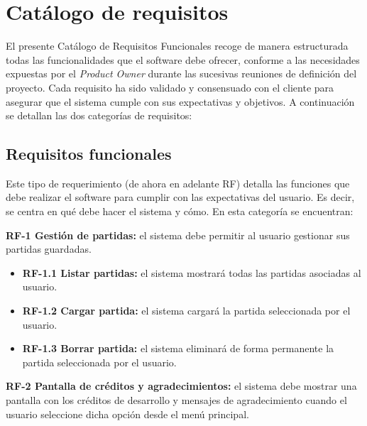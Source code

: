 \section{Catálogo de requisitos}
El presente Catálogo de Requisitos Funcionales recoge de manera estructurada todas las funcionalidades que el software debe ofrecer, conforme a las necesidades expuestas por el \textit{Product Owner} durante las sucesivas reuniones de definición del proyecto. Cada requisito ha sido validado y consensuado con el cliente para asegurar que el sistema cumple con sus expectativas y objetivos. A continuación se detallan las dos categorías de requisitos:

\subsection{Requisitos funcionales}
Este tipo de requerimiento (de ahora en adelante RF) detalla las funciones
que debe realizar el software para cumplir
con las expectativas del usuario. Es decir, se centra en qué debe hacer el
sistema y cómo. En esta categoría se encuentran:

\bigskip

\noindent
\textbf{RF-1 Gestión de partidas:} el sistema debe permitir al usuario gestionar sus partidas guardadas.  
\begin{itemize}
  \item \textbf{RF-1.1 Listar partidas:} el sistema mostrará todas las partidas asociadas al usuario.
  \item \textbf{RF-1.2 Cargar partida:} el sistema cargará la partida seleccionada por el usuario.
  \item \textbf{RF-1.3 Borrar partida:} el sistema eliminará de forma permanente la partida seleccionada por el usuario.
\end{itemize}

\bigskip

\noindent
\textbf{RF-2 Pantalla de créditos y agradecimientos:} el sistema debe mostrar una pantalla con los créditos de desarrollo y mensajes de agradecimiento cuando el usuario seleccione dicha opción desde el menú principal.

\bigskip


